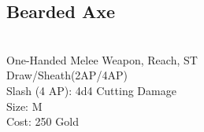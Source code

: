 \subsection{Bearded Axe}\label{weapon:beardedAxe}\\
One-Handed Melee Weapon,  Reach, ST\\
Draw/Sheath(2AP/4AP)\\
Slash (4 AP): 4d4 Cutting Damage\\
Size: M\\
Cost: 250 Gold\\